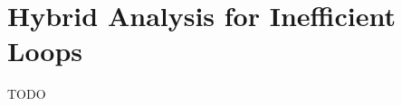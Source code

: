 \chapter[Hybrid Analysis for Inefficient Loops]{Hybrid Analysis for Inefficient Loops}
\label{chap:ldoctor}

TODO







